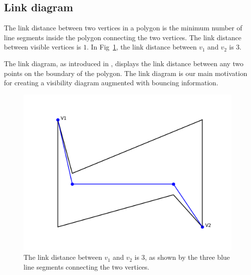 \documentclass[]{svproc}  %
\begin{document}
%    





\subsection{Link diagram}

The link distance between two vertices in a polygon is the minimum number of line segments inside the polygon connecting the two vertices. The link distance between visible vertices is $1$. In Fig~\ref{fig:link_dis}, the link distance between $v_1$ and $v_2$ is 3.

The link diagram, as introduced in \cite{tan_sweep}, displays the link distance between any two points on the boundary of the polygon. The link diagram is our main motivation for creating a visibility diagram augmented with bouncing information.
\begin{figure}
    \includegraphics[width=0.6\linewidth]{figures/link_distance.png}
    \centering
    \caption{The link distance between $v_1$ and $v_2$ is 3, as shown by the three blue line segments connecting the two vertices.}\label{fig:link_dis}
    \centering
\end{figure}
\end{document}
